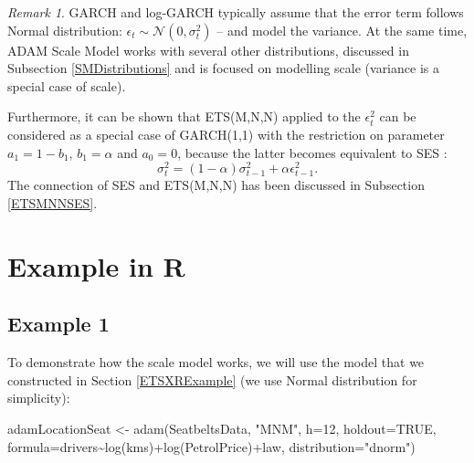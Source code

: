 \documentclass[
]{book}
\newenvironment{Shaded}{\begin{snugshade}}{\end{snugshade}}
\newcommand{\AttributeTok}[1]{\textcolor[rgb]{0.77,0.63,0.00}{#1}}
\newcommand{\ConstantTok}[1]{\textcolor[rgb]{0.00,0.00,0.00}{#1}}
\newcommand{\DecValTok}[1]{\textcolor[rgb]{0.00,0.00,0.81}{#1}}
\newcommand{\FunctionTok}[1]{\textcolor[rgb]{0.00,0.00,0.00}{#1}}
\newcommand{\NormalTok}[1]{#1}
\newcommand{\OtherTok}[1]{\textcolor[rgb]{0.56,0.35,0.01}{#1}}
\newcommand{\SpecialCharTok}[1]{\textcolor[rgb]{0.00,0.00,0.00}{#1}}
\newcommand{\StringTok}[1]{\textcolor[rgb]{0.31,0.60,0.02}{#1}}
\theoremstyle{definition}
\theoremstyle{definition}
\theoremstyle{definition}
\theoremstyle{definition}
\theoremstyle{remark}
\newtheorem*{remark}{Remark}
\begin{document}
\begin{remark}
GARCH and log-GARCH typically assume that the error term follows Normal distribution: \(\epsilon_t \sim \mathcal{N}(0, \sigma_t^2)\) -- and model the variance. At the same time, ADAM Scale Model works with several other distributions, discussed in Subsection \ref{SMDistributions} and is focused on modelling scale (variance is a special case of scale).
\end{remark}

Furthermore, it can be shown that ETS(M,N,N) applied to the \(\epsilon_t^2\) can be considered as a special case of GARCH(1,1) with the restriction on parameter \(a_1=1-b_1\), \(b_1= \alpha\) and \(a_0=0\), because the latter becomes equivalent to SES \citep{Geweke1986}:
\begin{equation}
    \sigma_t^2 = (1-\alpha) \sigma_{t-1}^2 + \alpha \epsilon_{t-1}^2 .
    \label{eq:GARCHSES}
\end{equation}
The connection of SES and ETS(M,N,N) has been discussed in Subsection \ref{ETSMNNSES}.

\hypertarget{example-in-r-1}{%
\section{Example in R}\label{example-in-r-1}}

\hypertarget{example-1}{%
\subsection{Example 1}\label{example-1}}

To demonstrate how the scale model works, we will use the model that we constructed in Section \ref{ETSXRExample} (we use Normal distribution for simplicity):

\begin{Shaded}
\begin{Highlighting}[]
\NormalTok{adamLocationSeat }\OtherTok{\textless{}{-}} \FunctionTok{adam}\NormalTok{(SeatbeltsData, }\StringTok{"MNM"}\NormalTok{, }\AttributeTok{h=}\DecValTok{12}\NormalTok{, }\AttributeTok{holdout=}\ConstantTok{TRUE}\NormalTok{,}
                         \AttributeTok{formula=}\NormalTok{drivers}\SpecialCharTok{\textasciitilde{}}\FunctionTok{log}\NormalTok{(kms)}\SpecialCharTok{+}\FunctionTok{log}\NormalTok{(PetrolPrice)}\SpecialCharTok{+}\NormalTok{law,}
                         \AttributeTok{distribution=}\StringTok{"dnorm"}\NormalTok{)}
\end{Highlighting}
\end{Shaded}
\end{document}
